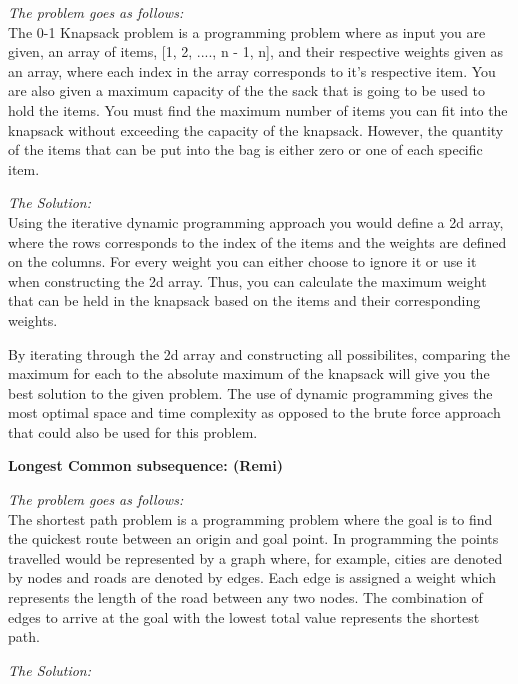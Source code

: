 \documentclass{article}
\begin{document}
\noindent \textit{The problem goes as follows:} \\

The 0-1 Knapsack problem is a programming problem where as input you
are given, an array of items, [1, 2, ...., n - 1, n], and their 
respective weights given as an array, where each index in the array
corresponds to it's respective item. You are also given a maximum capacity
of the the sack that is going to be used to hold the items. You must find
the maximum number of items you can fit into the knapsack without exceeding
the capacity of the knapsack. However, the quantity of the items that can
be put into the bag is either zero or one of each specific item.

\medskip

\noindent \textit{The Solution:} \\

Using the iterative dynamic programming approach you would define a 2d array,
where the rows corresponds to the index of the items and the weights are defined
on the columns. For every weight you can either choose to ignore it or use it
when constructing the 2d array. Thus, you can calculate the maximum weight
that can be held in the knapsack based on the items and their corresponding
weights.

By iterating through the 2d array and constructing all possibilites, comparing
the maximum for each to the absolute maximum of the knapsack will give you 
the best solution to the given problem. The use of dynamic programming gives
the most optimal space and time complexity as opposed to the brute force
approach that could also be used for this problem.

\bigskip

\noindent \textbf{Longest Common subsequence: (Remi)} 

\noindent \textit{The problem goes as follows:} \\

The shortest path problem is a programming problem where the goal is to find 
the quickest route between an origin and goal point. In programming the points
travelled would be represented by a graph where, for example, cities are denoted
by nodes and roads are denoted by edges. Each edge is assigned a weight which 
represents the length of the road between any two nodes. The combination of edges 
to arrive at the goal with the lowest total value represents the shortest path.

\medskip

\noindent \textit{The Solution:} \\
\end{document}
